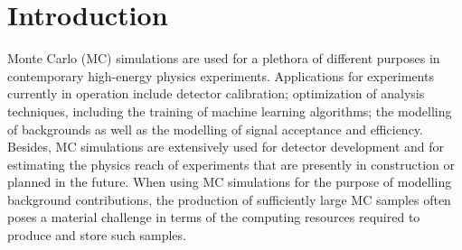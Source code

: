 \section{Introduction}
\label{sec:introduction}

Monte Carlo (MC) simulations are used for a plethora of different purposes in contemporary high-energy physics experiments.
Applications for experiments currently in operation include detector calibration; optimization of analysis techniques, including the training of machine learning algorithms;
the modelling of backgrounds as well as the modelling of signal acceptance and efficiency.
Besides, MC simulations are extensively used for detector development and for estimating the physics reach of experiments that are presently in construction or planned in the future.
When using MC simulations for the purpose of modelling background contributions,
the production of sufficiently large MC samples often poses a material challenge in terms of the computing resources required to produce and store such samples.

